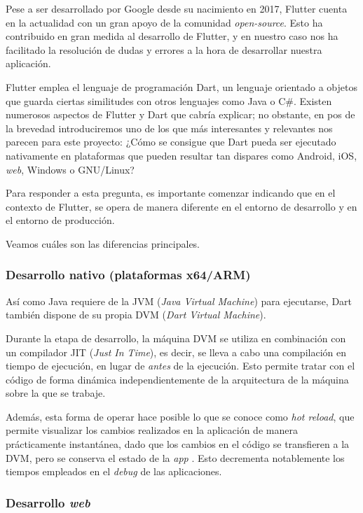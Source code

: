 Pese a ser desarrollado por Google desde su nacimiento en 2017, Flutter cuenta en la actualidad con un gran apoyo de la comunidad \emph{open-source}. Esto ha contribuido en gran medida al desarrollo de Flutter, y en nuestro caso nos ha facilitado la resolución de dudas y errores a la hora de desarrollar nuestra aplicación.

Flutter emplea el lenguaje de programación Dart, un lenguaje orientado a objetos que guarda ciertas similitudes con otros lenguajes como Java o C\#. Existen numerosos aspectos de Flutter y Dart que cabría explicar; no obstante, en pos de la brevedad introduciremos uno de los que más interesantes y relevantes nos parecen para este proyecto: ¿Cómo se consigue que Dart pueda ser ejecutado nativamente en plataformas que pueden resultar tan dispares como Android, iOS, \emph{web}, Windows o GNU/Linux?

Para responder a esta pregunta, es importante comenzar indicando que en el contexto de Flutter, se opera de manera diferente en el entorno de desarrollo y en el entorno de producción.

Veamos cuáles son las diferencias principales.

\subsubsection{Desarrollo nativo (plataformas x64/ARM)}

Así como Java requiere de la JVM (\emph{Java Virtual Machine}) para ejecutarse, Dart también dispone de su propia DVM (\emph{Dart Virtual Machine}).

Durante la etapa de desarrollo, la máquina DVM se utiliza en combinación con un compilador JIT (\emph{Just In Time}), es decir, se lleva a cabo una compilación en tiempo de ejecución, en lugar de \emph{antes} de la ejecución. Esto permite tratar con el código de forma dinámica independientemente de la arquitectura de la máquina sobre la que se trabaje.

Además, esta forma de operar hace posible lo que se conoce como \emph{hot reload}, que permite visualizar los cambios realizados en la aplicación de manera prácticamente instantánea, dado que los cambios en el código se transfieren a la DVM, pero se conserva el estado de la \emph{app} \cite{flutter-hot-reload}. Esto decrementa notablemente los tiempos empleados en el \emph{debug} de las aplicaciones.


\subsubsection{Desarrollo \emph{web}}

